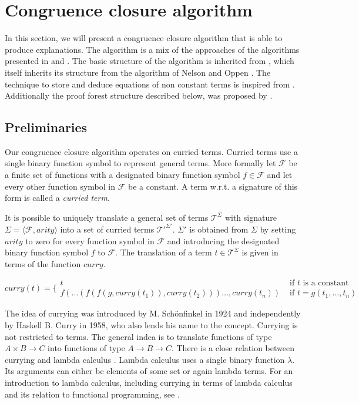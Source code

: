 \section*{Congruence closure algorithm}
\label{sec:algorithm}

In this section, we will present a congruence closure algorithm that is able to produce explanations.
The algorithm is a mix of the approaches of the algorithms presented in \cite{Fontaine2004} and \cite{Nieuwenhuis2005,Nieuwenhuis2007}.
The basic structure of the algorithm is inherited from \cite{Fontaine2004}, which itself inherits its structure from the algorithm of Nelson and Oppen \cite{Nelson1980}.
The technique to store and deduce equations of non constant terms is inspired from \cite{Nieuwenhuis2005,Nieuwenhuis2007}.
Additionally the proof forest structure described below, was proposed by \cite{Nieuwenhuis2005,Nieuwenhuis2007}.

\subsection*{Preliminaries}

Our congruence closure algorithm operates on curried terms.
Curried terms use a single binary function symbol to represent general terms.
More formally let $\mathcal{F}$ be a finite set of functions with a designated binary function symbol $f \in \mathcal{F}$ and let every other function symbol in $\mathcal{F}$ be a constant.
A term w.r.t. a signature of this form is called a \emph{curried term}.

It is possible to uniquely translate a general set of terms $\mathcal{T}^{\Sigma}$ with signature $\Sigma = \langle \mathcal{F},arity \rangle$ into a set of curried terms $\mathcal{T'}^{\Sigma'}$.
$\Sigma'$ is obtained from $\Sigma$ by setting $arity$ to zero for every function symbol in $\mathcal{F}$ and introducing the designated binary function symbol $f$ to $\mathcal{F}$.
The translation of a term $t \in \mathcal{T}^{\Sigma}$ is given in terms of the function $curry$.

$$
curry(t) = \Big\{
\begin{array}{ll}
	t & \text{ if } t \text{ is a constant }\\
	f(\ldots (f(f(g,curry(t_1)),curry(t_2)))\ldots,curry(t_n)) &\text{ if } t = g(t_1,\ldots, t_n)
\end{array}
$$

The idea of currying was introduced by M. Sch\"onfinkel \cite{Schoenfinkel1924} in 1924 and independently by Haskell B. Curry \cite{Curry1958} in 1958, who also lends his name to the concept.
Currying is not restricted to terms.
The general indea is to translate functions of type $A \times B \rightarrow C$ into functions of type $A \rightarrow B \rightarrow C$.
There is a close relation between currying and lambda calculus \cite{Church1936}.
Lambda calculus uses a single binary function $\lambda$.
Its arguments can either be elements of some set or again lambda terms.
For an introduction to lambda calculus, including currying in terms of lambda calculus and its relation to functional programming, see \cite{Barendregt1997}.

